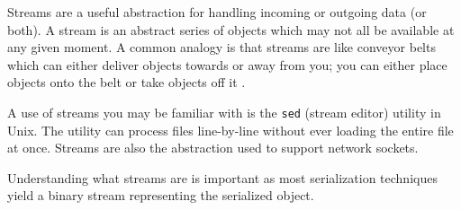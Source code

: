 Streams are a useful abstraction for handling incoming or outgoing data (or both). A stream is an abstract series of objects which may not all be available at any given moment. A common analogy is that streams are like conveyor belts which can either deliver objects towards or away from you; you can either place objects onto the belt or take objects off it \cite{so_streams}.

A use of streams you may be familiar with is the \texttt{sed} (stream editor) utility in Unix. The utility can process files line-by-line without ever loading the entire file at once. Streams are also the abstraction used to support network sockets. 

Understanding what streams are is important as most serialization techniques yield a binary stream representing the serialized object. 
